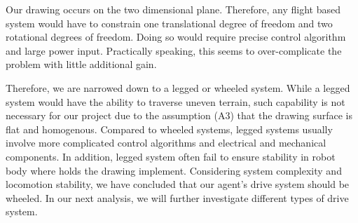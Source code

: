 Our drawing occurs on the two dimensional plane. Therefore, any flight based system would have to constrain one translational degree of freedom and two rotational degrees of freedom. Doing so would require precise control algorithm and large power input. Practically speaking, this seems to over-complicate the problem with little additional gain. 

Therefore, we are narrowed down to a legged or wheeled system. While a legged system would have the ability to traverse uneven terrain, such capability is not necessary for our project due to the assumption (A3) that the drawing surface is flat and homogenous. Compared to wheeled systems, legged systems usually involve more complicated control algorithms and electrical and mechanical components. In addition, legged system often fail to ensure stability in robot body where holds the drawing implement. Considering system complexity and locomotion stability, we have concluded that our agent's drive system should be wheeled. In our next analysis, we will further investigate different types of drive system. 

